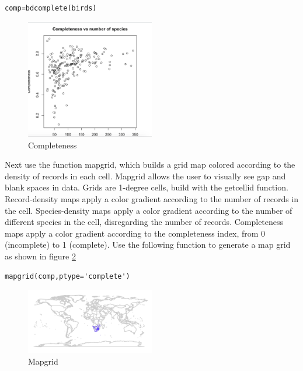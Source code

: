 \begin{lstlisting}
comp=bdcomplete(birds)
\end{lstlisting}

\begin{figure}[htbp!]
   \centering
   \includegraphics[width=0.5\textwidth]{pictures/biodiversity/complete.jpg} 
      \caption{Completeness}
   \label{fig:completeness}
\end{figure} 

Next use the function mapgrid, which builds a grid map colored according to the density of records in each cell.
Mapgrid allows the user to visually see gap and blank spaces in data.
Grids are 1-degree cells, build with the getcellid function.
Record-density maps apply a color gradient according to the number of records in the cell.
Species-density maps apply a color gradient according to the number of different species in the cell, disregarding the number of records.
Completeness maps apply a color gradient according to the completeness index, from 0 (incomplete) to 1 (complete).
Use the following function to generate a map grid as shown in figure \ref{fig:Mapgrid}

\begin{lstlisting}
mapgrid(comp,ptype='complete')
\end{lstlisting}

\begin{figure}[htbp!]
   \centering
   \includegraphics[width=0.5\textwidth]{pictures/biodiversity/map.jpg} 
      \caption{Mapgrid}
   \label{fig:Mapgrid}
\end{figure} 

